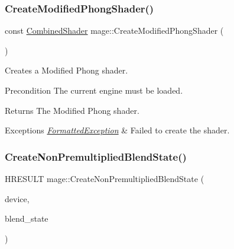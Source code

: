 \subsubsection{\texorpdfstring{Create\+Modified\+Phong\+Shader()}{CreateModifiedPhongShader()}}
{\footnotesize\ttfamily const \hyperlink{structmage_1_1_combined_shader}{Combined\+Shader} mage\+::\+Create\+Modified\+Phong\+Shader (\begin{DoxyParamCaption}{ }\end{DoxyParamCaption})}

Creates a Modified Phong shader.

\begin{DoxyPrecond}{Precondition}
The current engine must be loaded. 
\end{DoxyPrecond}
\begin{DoxyReturn}{Returns}
The Modified Phong shader. 
\end{DoxyReturn}

\begin{DoxyExceptions}{Exceptions}
{\em \hyperlink{structmage_1_1_formatted_exception}{Formatted\+Exception}} & Failed to create the shader. \\
\hline
\end{DoxyExceptions}
\hypertarget{namespacemage_a6f4e37e4b8092acec9dad9a8b24ebb07}{}\label{namespacemage_a6f4e37e4b8092acec9dad9a8b24ebb07} 
\subsubsection{\texorpdfstring{Create\+Non\+Premultiplied\+Blend\+State()}{CreateNonPremultipliedBlendState()}}
{\footnotesize\ttfamily H\+R\+E\+S\+U\+LT mage\+::\+Create\+Non\+Premultiplied\+Blend\+State (\begin{DoxyParamCaption}\item[{I\+D3\+D11\+Device2 $\ast$}]{device,  }\item[{I\+D3\+D11\+Blend\+State $\ast$$\ast$}]{blend\+\_\+state }\end{DoxyParamCaption})}

\hypertarget{namespacemage_ab2f30a0ab5f75edd279091ee24bc7811}{}\label{namespacemage_ab2f30a0ab5f75edd279091ee24bc7811} 
